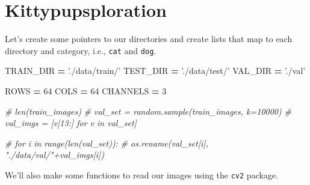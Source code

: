 \documentclass[]{book}
\newenvironment{Shaded}{\begin{snugshade}}{\end{snugshade}}
\newcommand{\DecValTok}[1]{\textcolor[rgb]{0.00,0.00,0.81}{#1}}
\newcommand{\StringTok}[1]{\textcolor[rgb]{0.31,0.60,0.02}{#1}}
\newcommand{\CommentTok}[1]{\textcolor[rgb]{0.56,0.35,0.01}{\textit{#1}}}
\newcommand{\OperatorTok}[1]{\textcolor[rgb]{0.81,0.36,0.00}{\textbf{#1}}}
\newcommand{\NormalTok}[1]{#1}
\theoremstyle{definition}
\theoremstyle{definition}
\theoremstyle{definition}
\theoremstyle{remark}
\begin{document}
\section{Kittypupsploration}\label{kittypupsploration}

Let's create some pointers to our directories and create lists that map
to each directory and category, i.e., \texttt{cat} and \texttt{dog}.

\begin{Shaded}
\begin{Highlighting}[]
\NormalTok{TRAIN_DIR }\OperatorTok{=} \StringTok{'./data/train/'}
\NormalTok{TEST_DIR }\OperatorTok{=} \StringTok{'./data/test/'}
\NormalTok{VAL_DIR }\OperatorTok{=} \StringTok{'./val'}

\NormalTok{ROWS }\OperatorTok{=} \DecValTok{64}
\NormalTok{COLS }\OperatorTok{=} \DecValTok{64}
\NormalTok{CHANNELS }\OperatorTok{=} \DecValTok{3}
\end{Highlighting}
\end{Shaded}

\begin{Shaded}
\begin{Highlighting}[]
\CommentTok{# len(train_images)}
\CommentTok{# val_set = random.sample(train_images, k=10000)}
\CommentTok{# val_imgs = [v[13:] for v in val_set]}

\CommentTok{# for i in range(len(val_set)):}
\CommentTok{#     os.rename(val_set[i], "./data/val/"+val_imgs[i])}
\end{Highlighting}
\end{Shaded}

We'll also make some functions to read our images using the \texttt{cv2}
package.
\end{document}
